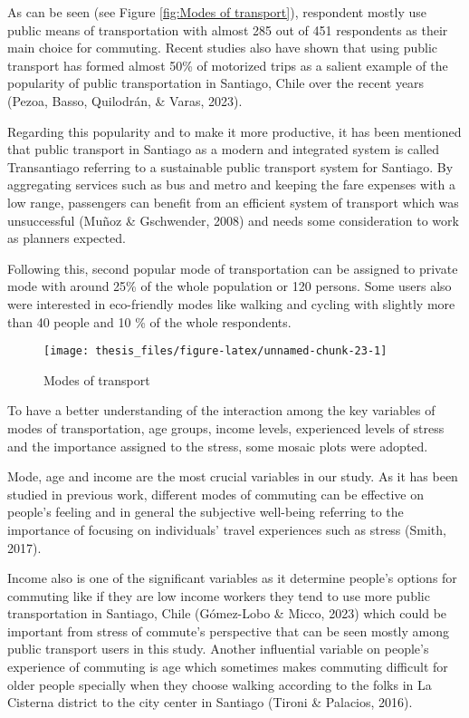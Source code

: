 \documentclass[
11pt, %
oneside, %
english, %
singlespacing, %
]{macthesis} %
\begin{document}
As can be seen (see Figure \ref{fig:Modes of transport}), respondent mostly use public means of transportation with almost 285 out of 451 respondents as their main choice for commuting. Recent studies also have shown that using public transport has formed almost 50\% of motorized trips as a salient example of the popularity of public transportation in Santiago, Chile over the recent years (Pezoa, Basso, Quilodrán, \& Varas, 2023).

Regarding this popularity and to make it more productive, it has been mentioned that public transport in Santiago as a modern and integrated system is called Transantiago referring to a sustainable public transport system for Santiago. By aggregating services such as bus and metro and keeping the fare expenses with a low range, passengers can benefit from an efficient system of transport which was unsuccessful (Muñoz \& Gschwender, 2008) and needs some consideration to work as planners expected.

Following this, second popular mode of transportation can be assigned to private mode with around 25\% of the whole population or 120 persons. Some users also were interested in eco-friendly modes like walking and cycling with slightly more than 40 people and 10 \% of the whole respondents.
\begin{figure}

{\centering \texttt{[image: thesis\_files/figure-latex/unnamed-chunk-23-1]} 

}

\caption{\label{fig:Modes of transport}Modes of transport}\label{fig:unnamed-chunk-23}
\end{figure}
To have a better understanding of the interaction among the key variables of modes of transportation, age groups, income levels, experienced levels of stress and the importance assigned to the stress, some mosaic plots were adopted.

Mode, age and income are the most crucial variables in our study. As it has been studied in previous work, different modes of commuting can be effective on people's feeling and in general the subjective well-being referring to the importance of focusing on individuals' travel experiences such as stress (Smith, 2017).

Income also is one of the significant variables as it determine people's options for commuting like if they are low income workers they tend to use more public transportation in Santiago, Chile (Gómez-Lobo \& Micco, 2023) which could be important from stress of commute's perspective that can be seen mostly among public transport users in this study. Another influential variable on people's experience of commuting is age which sometimes makes commuting difficult for older people specially when they choose walking according to the folks in La Cisterna district to the city center in Santiago (Tironi \& Palacios, 2016).
\end{document}
